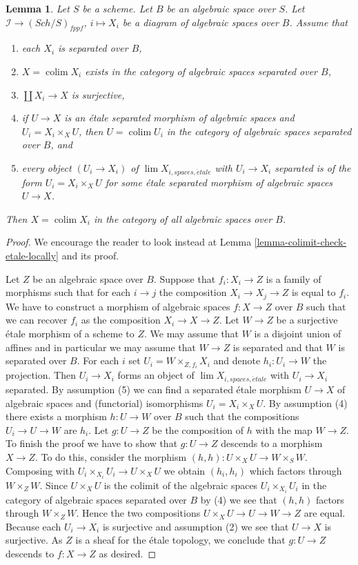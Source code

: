 \documentclass[10pt,a4paper]{amsart}
\theoremstyle{plain}
\newtheorem{lemma}[subsection]{Lemma}
\theoremstyle{definition}
\theoremstyle{remark}
\numberwithin{equation}{subsection}
\def\lim{\mathop{\mathrm{lim}}\nolimits}
\def\colim{\mathop{\mathrm{colim}}\nolimits}
\def\Sch{\mathit{Sch}}
\def\etale{{\acute{e}tale}}
\begin{document}
\begin{lemma}
\label{lemma-colimit-separated-enough}
Let $S$ be a scheme. Let $B$ be an algebraic space over $S$.
Let $\mathcal{I} \to (\Sch/S)_{fppf}$, $i \mapsto X_i$
be a diagram of algebraic spaces over $B$. Assume that
\begin{enumerate}
\item each $X_i$ is separated over $B$,
\item $X = \colim X_i$ exists in the category of
algebraic spaces separated over $B$,
\item $\coprod X_i \to X$ is surjective,
\item if $U \to X$ is an \'etale separated morphism of algebraic spaces and
$U_i = X_i \times_X U$, then $U = \colim U_i$ in
the category of algebraic spaces separated over $B$, and
\item every object $(U_i \to X_i)$ of $\lim X_{i, spaces, \etale}$
with $U_i \to X_i$ separated is of the form $U_i = X_i \times_X U$
for some \'etale separated morphism of algebraic spaces $U \to X$.
\end{enumerate}
Then $X = \colim X_i$ in the category of all algebraic spaces over $B$.
\end{lemma}

\begin{proof}
We encourage the reader to look instead at
Lemma \ref{lemma-colimit-check-etale-locally}
and its proof.

\medskip\noindent
Let $Z$ be an algebraic space over $B$. Suppose that $f_i : X_i \to Z$ is
a family of morphisms such that for each $i \to j$ the composition
$X_i \to X_j \to Z$ is equal to $f_i$. We have to construct a morphism
of algebraic spaces $f : X \to Z$ over $B$ such that we can recover $f_i$ as
the composition $X_i \to X \to Z$. Let $W \to Z$ be a surjective
\'etale morphism of a scheme to $Z$. We may assume that $W$ is a
disjoint union of affines and in particular we may assume that
$W \to Z$ is separated and that $W$ is separated over $B$. For each $i$ set
$U_i = W \times_{Z, f_i} X_i$ and denote $h_i : U_i \to W$ the projection.
Then $U_i \to X_i$ forms an object of $\lim X_{i, spaces, \etale}$
with $U_i \to X_i$ separated. By
assumption (5) we can find a separated \'etale morphism $U \to X$
of algebraic spaces and (functorial) isomorphisms $U_i = X_i \times_X U$.
By assumption (4) there exists a morphism $h : U \to W$ over $B$
such that the compositions $U_i \to U \to W$ are $h_i$.
Let $g : U \to Z$ be the composition of $h$ with the map $W \to Z$. To
finish the proof we have to show that $g : U \to Z$
descends to a morphism $X \to Z$. To do this, consider the morphism
$(h, h) : U \times_X U \to W \times_S W$.
Composing with $U_i \times_{X_i} U_i \to U \times_X U$ we obtain
$(h_i, h_i)$ which factors through $W \times_Z W$. Since $U \times_X U$
is the colimit of the algebraic spaces $U_i \times_{X_i} U_i$
in the category of algebraic spaces separated over $B$ by (4) we see
that $(h, h)$ factors through $W \times_Z W$. Hence the two compositions
$U \times_X U \to U \to W \to Z$ are equal. Because each $U_i \to X_i$ is
surjective and assumption (2) we see that $U \to X$ is surjective.
As $Z$ is a sheaf for the \'etale topology, we conclude that
$g : U \to Z$ descends to $f : X \to Z$ as desired.
\end{proof}
\end{document}
